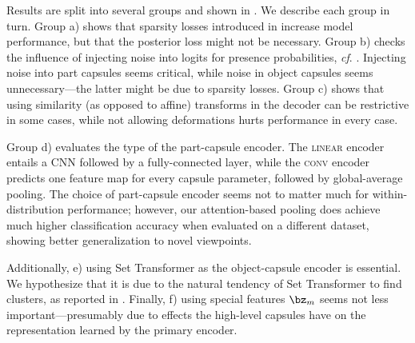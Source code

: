 Results are split into several groups and shown in .
We describe each group in turn.
Group a) shows that sparsity losses introduced in  increase model performance, but that the posterior loss might not be necessary.
Group b) checks the influence of injecting noise into logits for presence probabilities, \textit{cf}. .  Injecting noise into part capsules seems critical, while noise in object capsules seems unnecessary---the latter might be due to sparsity losses.
Group c) shows that using similarity (as opposed to affine) transforms in the decoder can be restrictive in some cases, while not allowing deformations hurts performance in every case.

Group d) evaluates the type of the part-capsule encoder.
The \textsc{linear} encoder entails a \gls{CNN} followed by a fully-connected layer, while the \textsc{conv} encoder predicts one feature map for every capsule parameter, followed by global-average pooling. 
The choice of part-capsule encoder seems not to matter much for within-distribution performance; however, our attention-based pooling does achieve much higher classification accuracy when evaluated on a different dataset, showing better generalization to novel viewpoints.

Additionally, e) using Set Transformer as the object-capsule encoder is essential.
We hypothesize that it is due to the natural tendency of Set Transformer to find clusters, as reported in \cite{Lee2019set}.
Finally, f) using special features $\bz_m$ seems not less important---presumably due to effects the high-level capsules have on the representation learned by the primary encoder.